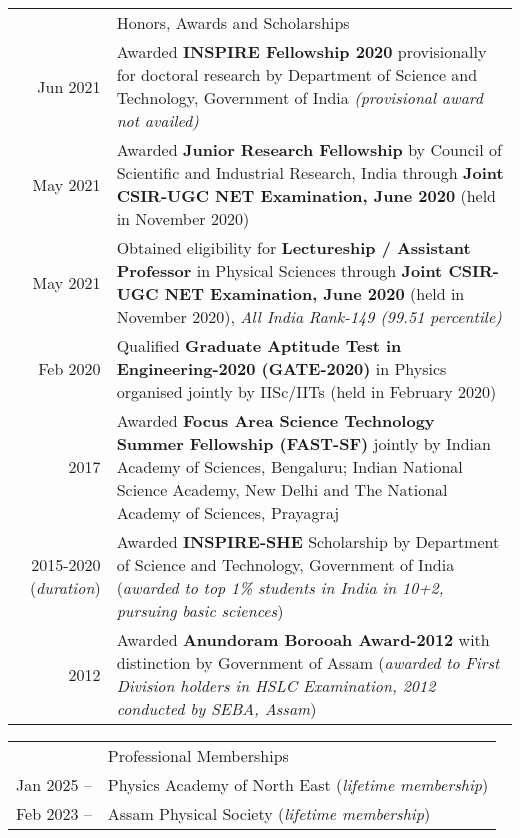 \documentclass[a4paper, 11pt]{article}
\newcommand{\headingfont}{\Large\color{Bittersweet}}
\newenvironment{SectionTable}[1]{
	\renewcommand*{\arraystretch}{1.7}
	\setlength{\tabcolsep}{10pt}
	\begin{longtable}{Rp{5.2in}} & #1 \\}
{\end{longtable}\vspace{-.3cm}}
\begin{document}
\begin{SectionTable}{\headingfont Honors, Awards and Scholarships}
Jun 2021 & 
Awarded \textbf{INSPIRE Fellowship 2020} provisionally for doctoral research by Department of Science and Technology, Government of India \textit{(provisional award not availed)}
\\
	
May 2021 &
Awarded \textbf{Junior Research Fellowship} by Council of Scientific and
Industrial Research, India through \textbf{Joint CSIR-UGC NET Examination, June 2020}
(held in November 2020) \\ %
	
May 2021 &
Obtained eligibility for \textbf{Lectureship / Assistant Professor} in Physical Sciences through \textbf{Joint CSIR-UGC NET Examination, June 2020}
(held in November 2020), \textit{All India Rank-149 (99.51 percentile)} \\
	
Feb 2020 &
Qualified \textbf{Graduate Aptitude Test in Engineering-2020 (GATE-2020)} in Physics organised jointly by IISc/IITs (held in February 2020) \\
	
2017 &
Awarded \textbf{Focus Area Science Technology Summer Fellowship (FAST-SF)} jointly by Indian Academy of Sciences, Bengaluru; Indian National Science Academy, New Delhi and The National Academy of Sciences, Prayagraj \\
	
2015-2020 (\textit{duration})&
Awarded \textbf{INSPIRE-SHE} Scholarship by Department of Science and Technology, Government of India (\textit{awarded to top 1\% students in India in 10+2, pursuing basic sciences}) \\
	
2012 &
Awarded \textbf{Anundoram Borooah Award-2012} with distinction by Government of Assam (\textit{awarded to First Division holders in HSLC Examination, 2012 conducted by SEBA, Assam}) \\
	
\end{SectionTable}


\begin{SectionTable}{\headingfont Professional Memberships}
Jan 2025 --  &
Physics Academy of North East (\textit{lifetime membership}) \\
Feb 2023 --  &
Assam Physical Society (\textit{lifetime membership}) \\


\end{SectionTable}
\end{document}
